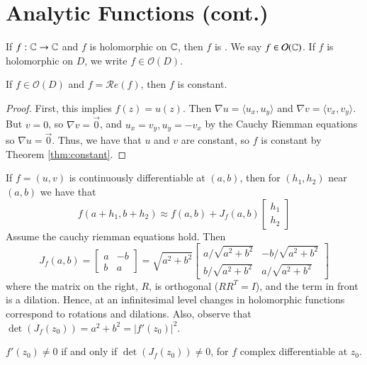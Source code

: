 \documentclass[12pt, a4paper, oneside, openright, titlepage]{book}
\begin{document}
\section{Analytic Functions (cont.)}

\begin{defn}
    If $f:\mathbb C\rightarrow \mathbb C$ and $f$ is holomorphic on $\mathbb C$, then $f$ is . We say $f \in \mathcal{O}(\mathbb C)$. If $f$ is holomorphic on $D$, we write $f \in \mathcal{O}(D)$.
\end{defn}


\begin{thm}
    If $f \in \mathcal{O}(D)$ and $f = \mathscr{R}e(f)$, then $f$ is constant.
\end{thm}
\begin{proof}
    First, this implies $f(z) = u(z)$. Then $\nabla u = \langle u_x,u_y\rangle$ and $\nabla v = \langle v_x, v_y\rangle$. But $v = 0$, so $\nabla v = \vec{0}$, and $u_x = v_y, u_y = -v_x$ by the Cauchy Riemman equations so $\nabla u = \vec{0}$. Thus, we have that $u$ and $v$ are constant, so $f$ is constant by Theorem \ref{thm:constant}.
\end{proof}

If $f = (u,v)$ is continuously differentiable at $(a,b)$, then for $(h_1,h_2)$ near $(a,b)$ we have that \begin{equation*}
    f(a+h_1,b+h_2) \approx f(a,b) + J_f(a,b)\begin{bmatrix} h_1 \\ h_2 \end{bmatrix}
\end{equation*}
Assume the cauchy riemman equations hold. Then \begin{equation*}
    J_f(a,b) = \begin{bmatrix} a & -b \\ b & a \end{bmatrix} = \sqrt{a^2+b^2}\begin{bmatrix} a/\sqrt{a^2+b^2} & -b/\sqrt{a^2+b^2} \\ b/\sqrt{a^2+b^2} & a/\sqrt{a^2+b^2} \end{bmatrix}
\end{equation*}
where the matrix on the right, $R$, is orthogonal ($RR^T = I$), and the term in front is a dilation. Hence, at an infinitesimal level changes in holomorphic functions correspond to rotations and dilations. Also, observe that $\det(J_f(z_0)) = a^2+b^2 = |f'(z_0)|^2$.

\begin{thm}
    $f'(z_0) \neq 0$ if and only if $\det(J_f(z_0)) \neq 0$, for $f$ complex differentiable at $z_0$. 
\end{thm}
\end{document}
